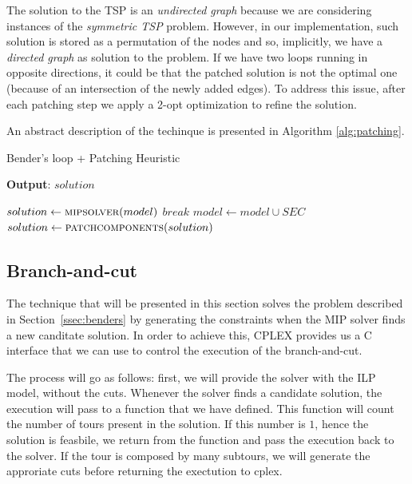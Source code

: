 \documentclass{article}
\begin{document}
The solution to the TSP is an \textit{undirected graph} because
we are considering instances of the \textit{symmetric TSP} problem.
However, in our implementation, such solution is stored as a permutation of the nodes and
so, implicitly, we have a \textit{directed graph} as solution to the problem.
If we have two loops running in opposite directions, it could be that the
patched solution is not the optimal one (because of an intersection of the newly added edges).
To address this issue, after each patching step we apply a 2-opt optimization to refine the solution.

An abstract description of the techinque is presented in Algorithm \ref{alg:patching}.

\begin{algorithm}[ht]
\caption{Bender's loop + Patching Heuristic}
\label{alg:patching}
\hspace*{0.5em} \textbf{Output}: $solution$
\begin{algorithmic}
                \State $solution \gets \Call{mipsolver}{model}$
                        \State $break$
                \EndIf
                \State $model \gets model \cup SEC$
                \State $solution \gets \Call{patchcomponents}{solution}$
        \EndWhile
\EndProcedure
\end{algorithmic}
\end{algorithm}

\subsection{Branch-and-cut}
The technique that will be presented in this section solves the problem
described in Section~\ref{ssec:benders} by generating the constraints when
the MIP solver finds a new canditate solution. In order to achieve this,
CPLEX provides us a C interface that we can use to control the execution
of the branch-and-cut.

The process will go as follows: first, we will provide the solver with the
ILP model, without the cuts. Whenever the solver finds a candidate solution,
the execution will pass to a function that we have defined. This function
will count the number of tours present in the solution. If this number is $1$,
hence the solution is feasbile, we return from the function and pass the
execution back to the solver. If the tour is composed by many subtours,
we will generate the approriate cuts before returning the exectution to
cplex.
\end{document}
